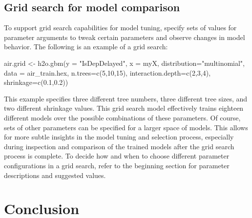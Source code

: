 \documentclass[11pt]{article}
\begin{document}
{\subsection{Grid search for model comparison} 

To support grid search capabilities for model tuning,  specify sets of values for parameter arguments to tweak certain parameters and observe changes in model behavior. The following is an example of a grid search:

\begin{spverbatim}

air.grid <- h2o.gbm(y = "IsDepDelayed", x = myX, 
                   distribution="multinomial", 
                   data = air_train.hex, n.trees=c(5,10,15), 
                   interaction.depth=c(2,3,4), 
                   shrinkage=c(0.1,0.2))

\end{spverbatim}
\noindent
This example specifies three different tree numbers, three different tree sizes, and two different shrinkage values. This grid search model effectively trains eighteen different models over the possible combinations of these parameters. Of course, sets of other parameters can be specified for a larger space of models. This allows for more subtle insights in the model tuning and selection process, especially during inspection and comparison of the trained models after the grid search process is complete. To decide how and when to choose different parameter configurations in a grid search, refer to the beginning section for parameter descriptions and suggested values.


\section{Conclusion}

}
\end{document}

